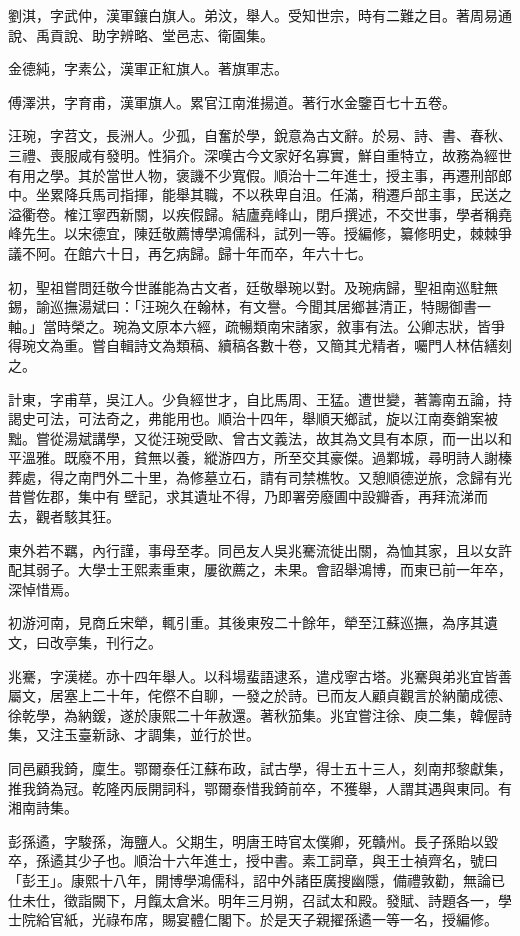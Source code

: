 \begin{pinyinscope}
劉淇，字武仲，漢軍鑲白旗人。弟汶，舉人。受知世宗，時有二難之目。著周易通說、禹貢說、助字辨略、堂邑志、衛園集。

金德純，字素公，漢軍正紅旗人。著旗軍志。

傅澤洪，字育甫，漢軍旗人。累官江南淮揚道。著行水金鑒百七十五卷。

汪琬，字苕文，長洲人。少孤，自奮於學，銳意為古文辭。於易、詩、書、春秋、三禮、喪服咸有發明。性狷介。深嘆古今文家好名寡實，鮮自重特立，故務為經世有用之學。其於當世人物，褒譏不少寬假。順治十二年進士，授主事，再遷刑部郎中。坐累降兵馬司指揮，能舉其職，不以秩卑自沮。任滿，稍遷戶部主事，民送之溢衢卷。榷江寧西新關，以疾假歸。結廬堯峰山，閉戶撰述，不交世事，學者稱堯峰先生。以宋德宜，陳廷敬薦博學鴻儒科，試列一等。授編修，纂修明史，棘棘爭議不阿。在館六十日，再乞病歸。歸十年而卒，年六十七。

初，聖祖嘗問廷敬今世誰能為古文者，廷敬舉琬以對。及琬病歸，聖祖南巡駐無錫，諭巡撫湯斌曰：「汪琬久在翰林，有文譽。今聞其居鄉甚清正，特賜御書一軸。」當時榮之。琬為文原本六經，疏暢類南宋諸家，敘事有法。公卿志狀，皆爭得琬文為重。嘗自輯詩文為類稿、續稿各數十卷，又簡其尤精者，囑門人林佶繕刻之。

計東，字甫草，吳江人。少負經世才，自比馬周、王猛。遭世變，著籌南五論，持謁史可法，可法奇之，弗能用也。順治十四年，舉順天鄉試，旋以江南奏銷案被黜。嘗從湯斌講學，又從汪琬受歐、曾古文義法，故其為文具有本原，而一出以和平溫雅。既廢不用，貧無以養，縱游四方，所至交其豪傑。過鄴城，尋明詩人謝榛葬處，得之南門外二十里，為修墓立石，請有司禁樵牧。又憩順德逆旅，念歸有光昔嘗佐郡，集中有壁記，求其遺址不得，乃即署旁廢圃中設瓣香，再拜流涕而去，觀者駭其狂。

東外若不羈，內行謹，事母至孝。同邑友人吳兆騫流徙出關，為恤其家，且以女許配其弱子。大學士王熙素重東，屢欲薦之，未果。會詔舉鴻博，而東已前一年卒，深悼惜焉。

初游河南，見商丘宋犖，輒引重。其後東歿二十餘年，犖至江蘇巡撫，為序其遺文，曰改亭集，刊行之。

兆騫，字漢槎。亦十四年舉人。以科場蜚語逮系，遣戍寧古塔。兆騫與弟兆宜皆善屬文，居塞上二十年，侘傺不自聊，一發之於詩。已而友人顧貞觀言於納蘭成德、徐乾學，為納鍰，遂於康熙二十年赦還。著秋笳集。兆宜嘗注徐、庾二集，韓偓詩集，又注玉臺新詠、才調集，並行於世。

同邑顧我錡，廩生。鄂爾泰任江蘇布政，試古學，得士五十三人，刻南邦黎獻集，推我錡為冠。乾隆丙辰開詞科，鄂爾泰惜我錡前卒，不獲舉，人謂其遇與東同。有湘南詩集。

彭孫遹，字駿孫，海鹽人。父期生，明唐王時官太僕卿，死贛州。長子孫貽以毀卒，孫遹其少子也。順治十六年進士，授中書。素工詞章，與王士禎齊名，號曰「彭王」。康熙十八年，開博學鴻儒科，詔中外諸臣廣搜幽隱，備禮敦勸，無論已仕未仕，徵詣闕下，月餼太倉米。明年三月朔，召試太和殿。發賦、詩題各一，學士院給官紙，光祿布席，賜宴體仁閣下。於是天子親擢孫遹一等一名，授編修。


\end{pinyinscope}
